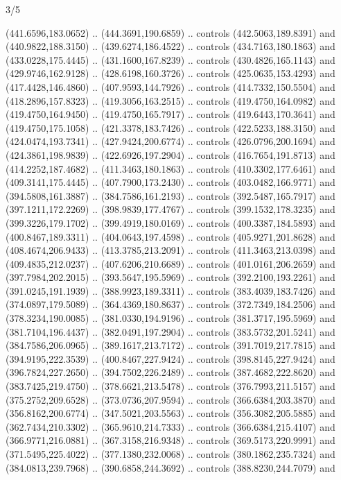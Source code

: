 \begin{flagdescription}{3/5}
\begin{scope}[xshift=0.5\flaglength]
\begin{scope}[scale=0.00167\flagwidth,yshift=210.9mm,xshift=-175.8mm]
\begin{scope}[y=-1pt, x=1pt]
  (441.6596,183.0652) .. (444.3691,190.6859) .. controls (442.5063,189.8391) and
  (440.9822,188.3150) .. (439.6274,186.4522) .. controls (434.7163,180.1863) and
  (433.0228,175.4445) .. (431.1600,167.8239) .. controls (430.4826,165.1143) and
  (429.9746,162.9128) .. (428.6198,160.3726) .. controls (425.0635,153.4293) and
  (417.4428,146.4860) .. (407.9593,144.7926) .. controls (414.7332,150.5504) and
  (418.2896,157.8323) .. (419.3056,163.2515) .. controls (419.4750,164.0982) and
  (419.4750,164.9450) .. (419.4750,165.7917) .. controls (419.6443,170.3641) and
  (419.4750,175.1058) .. (421.3378,183.7426) .. controls (422.5233,188.3150) and
  (424.0474,193.7341) .. (427.9424,200.6774) .. controls (426.0796,200.1694) and
  (424.3861,198.9839) .. (422.6926,197.2904) .. controls (416.7654,191.8713) and
  (414.2252,187.4682) .. (411.3463,180.1863) .. controls (410.3302,177.6461) and
  (409.3141,175.4445) .. (407.7900,173.2430) .. controls (403.0482,166.9771) and
  (394.5808,161.3887) .. (384.7586,161.2193) .. controls (392.5487,165.7917) and
  (397.1211,172.2269) .. (398.9839,177.4767) .. controls (399.1532,178.3235) and
  (399.3226,179.1702) .. (399.4919,180.0169) .. controls (400.3387,184.5893) and
  (400.8467,189.3311) .. (404.0643,197.4598) .. controls (405.9271,201.8628) and
  (408.4674,206.9433) .. (413.3785,213.2091) .. controls (411.3463,213.0398) and
  (409.4835,212.0237) .. (407.6206,210.6689) .. controls (401.0161,206.2659) and
  (397.7984,202.2015) .. (393.5647,195.5969) .. controls (392.2100,193.2261) and
  (391.0245,191.1939) .. (388.9923,189.3311) .. controls (383.4039,183.7426) and
  (374.0897,179.5089) .. (364.4369,180.8637) .. controls (372.7349,184.2506) and
  (378.3234,190.0085) .. (381.0330,194.9196) .. controls (381.3717,195.5969) and
  (381.7104,196.4437) .. (382.0491,197.2904) .. controls (383.5732,201.5241) and
  (384.7586,206.0965) .. (389.1617,213.7172) .. controls (391.7019,217.7815) and
  (394.9195,222.3539) .. (400.8467,227.9424) .. controls (398.8145,227.9424) and
  (396.7824,227.2650) .. (394.7502,226.2489) .. controls (387.4682,222.8620) and
  (383.7425,219.4750) .. (378.6621,213.5478) .. controls (376.7993,211.5157) and
  (375.2752,209.6528) .. (373.0736,207.9594) .. controls (366.6384,203.3870) and
  (356.8162,200.6774) .. (347.5021,203.5563) .. controls (356.3082,205.5885) and
  (362.7434,210.3302) .. (365.9610,214.7333) .. controls (366.6384,215.4107) and
  (366.9771,216.0881) .. (367.3158,216.9348) .. controls (369.5173,220.9991) and
  (371.5495,225.4022) .. (377.1380,232.0068) .. controls (380.1862,235.7324) and
  (384.0813,239.7968) .. (390.6858,244.3692) .. controls (388.8230,244.7079) and

\end{scope}
\end{scope}
\end{scope}
\end{flagdescription}
